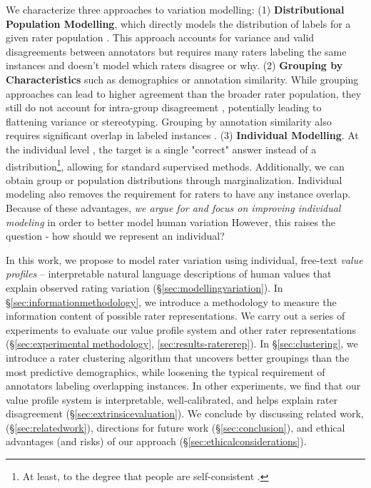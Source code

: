 \documentclass[11pt]{article}
\begin{document}
We characterize three approaches to variation modelling:
(1) {\textbf{Distributional Population Modelling}}, which directly models the distribution of labels for a given rater population \citep{zhang2024divergingpreferencesannotatorsdisagree, siththaranjan2024distributionalpreferencelearningunderstanding}. This approach accounts for variance and valid disagreements between annotators but requires many raters labeling the same instances and doesn't model which raters disagree or why. (2)  {\textbf{Grouping by Characteristics}} such as demographics or annotation similarity. While grouping approaches can lead to higher agreement than the broader rater population, they still do not account for intra-group disagreement \citep{hwang2023aligninglanguagemodelsuser, prabhakaran-etal-2024-grasp}, potentially leading to flattening variance or stereotyping.
Grouping by annotation similarity also requires significant overlap in labeled instances \citep{li-etal-2024-steerability, vitsakis2024voicescrowdsearchingclusters}.
(3) {\textbf{ Individual Modelling}}. At the individual level \citep{Gordon_2022, jiang2024languagemodelsreasonindividualistic}, the target is a single "correct" answer instead of a distribution\footnote{ At least, to the degree that people are self-consistent \citep{abercrombie2023consistencykeydisentanglinglabel}.}, allowing for standard supervised methods.
Additionally, we can obtain group or population distributions through marginalization. Individual modeling also removes the requirement for raters to have any instance overlap. 
Because of these advantages, \textit{we argue for and focus on improving individual modeling} in order to better model human variation
However, this raises the question - how should we represent an individual?

In this work, we propose to model rater variation using individual, free-text {\em value profiles} -- interpretable natural language descriptions of human values that explain observed rating variation (\S \ref{sec:modellingvariation}).
In \S \ref{sec:informationmethodology}, we introduce a methodology to measure the information content of possible rater representations.
We carry out a series of experiments to evaluate our value profile system and other rater representations (\S \ref{sec:experimental methodology}, \ref{sec:results-ratererep}).
In \S \ref{sec:clustering}, we introduce a rater clustering algorithm that uncovers better groupings than the most predictive demographics, while loosening the typical requirement of annotators labeling overlapping instances.
In other experiments, we find that our value profile system is interpretable, well-calibrated, and helps explain rater disagreement (\S \ref{sec:extrinsicevaluation}).
We conclude by discussing related work, (\S \ref{sec:relatedwork}), directions for future work (\S \ref{sec:conclusion}), and ethical advantages (and risks) of our approach (\S \ref{sec:ethicalconsiderations}).
\end{document}

